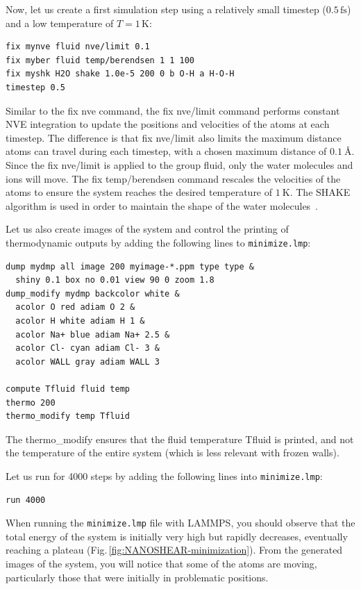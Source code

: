 \documentclass[9pt,tutorial]{livecoms}
\newcommand{\lmpcmd}[1]{\hspace{0pt}\colorbox{listing}{\textcolor{command}{\small{#1}}}\hspace{0pt}} %
\newcommand{\flecmd}[1]{\textcolor{command}{\texttt{#1}}} %
\begin{document}
Now, let us create a first simulation step using a relatively small
timestep ($0.5\,\text{fs}$) and a low temperature of $T = 1\,\text{K}$:
\begin{lstlisting}
fix mynve fluid nve/limit 0.1
fix myber fluid temp/berendsen 1 1 100
fix myshk H2O shake 1.0e-5 200 0 b O-H a H-O-H
timestep 0.5
\end{lstlisting}
Similar to the \lmpcmd{fix nve} command, the \lmpcmd{fix nve/limit} command performs constant
NVE integration to update the positions and velocities of the atoms at each
timestep.  The difference is that \lmpcmd{fix nve/limit} also limits the maximum
distance atoms can travel during each timestep, with a chosen maximum distance
of $0.1~\text{\AA{}}$.  Since the \lmpcmd{fix nve/limit} is applied to the
group \lmpcmd{fluid}, only the water molecules and ions will move.
The \lmpcmd{fix temp/berendsen} command rescales the velocities of the atoms
to ensure the system reaches the desired temperature of $1~\text{K}$.
The SHAKE algorithm is used in order to maintain
the shape of the water molecules~\cite{ryckaert1977numerical, andersen1983rattle}.

Let us also create images of the system and control
the printing of thermodynamic outputs by adding the following lines
to \flecmd{minimize.lmp}:
\begin{lstlisting}
dump mydmp all image 200 myimage-*.ppm type type &
  shiny 0.1 box no 0.01 view 90 0 zoom 1.8
dump_modify mydmp backcolor white &
  acolor O red adiam O 2 &
  acolor H white adiam H 1 &
  acolor Na+ blue adiam Na+ 2.5 &
  acolor Cl- cyan adiam Cl- 3 &
  acolor WALL gray adiam WALL 3

compute Tfluid fluid temp
thermo 200
thermo_modify temp Tfluid
\end{lstlisting}
The \lmpcmd{thermo\_modify} ensures that the fluid temperature \lmpcmd{Tfluid}
is printed, and not the temperature of the entire system (which is less relevant
with frozen walls).

Let us run for 4000 steps by adding the following lines into \flecmd{minimize.lmp}:
\begin{lstlisting}
run 4000
\end{lstlisting}
When running the \flecmd{minimize.lmp} file with LAMMPS, you should observe that the
total energy of the system is initially very high but rapidly decreases,
eventually reaching a plateau (Fig.\,\ref{fig:NANOSHEAR-minimization}).  From the generated
images of the system, you will notice that some of the atoms are moving, particularly
those that were initially in problematic positions.
\end{document}
